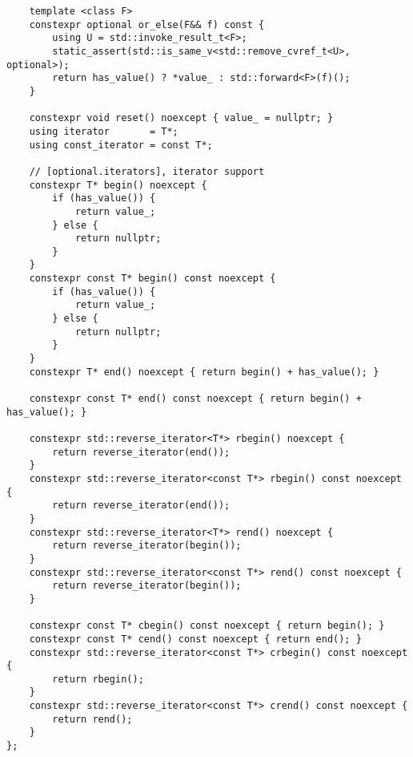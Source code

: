 \documentclass[a4paper,10pt,oneside,openany,final,article]{memoir}
\begin{document}
\begin{verbatim}
    template <class F>
    constexpr optional or_else(F&& f) const {
        using U = std::invoke_result_t<F>;
        static_assert(std::is_same_v<std::remove_cvref_t<U>, optional>);
        return has_value() ? *value_ : std::forward<F>(f)();
    }

    constexpr void reset() noexcept { value_ = nullptr; }
    using iterator       = T*;
    using const_iterator = const T*;

    // [optional.iterators], iterator support
    constexpr T* begin() noexcept {
        if (has_value()) {
            return value_;
        } else {
            return nullptr;
        }
    }
    constexpr const T* begin() const noexcept {
        if (has_value()) {
            return value_;
        } else {
            return nullptr;
        }
    }
    constexpr T* end() noexcept { return begin() + has_value(); }

    constexpr const T* end() const noexcept { return begin() + has_value(); }

    constexpr std::reverse_iterator<T*> rbegin() noexcept {
        return reverse_iterator(end());
    }
    constexpr std::reverse_iterator<const T*> rbegin() const noexcept {
        return reverse_iterator(end());
    }
    constexpr std::reverse_iterator<T*> rend() noexcept {
        return reverse_iterator(begin());
    }
    constexpr std::reverse_iterator<const T*> rend() const noexcept {
        return reverse_iterator(begin());
    }

    constexpr const T* cbegin() const noexcept { return begin(); }
    constexpr const T* cend() const noexcept { return end(); }
    constexpr std::reverse_iterator<const T*> crbegin() const noexcept {
        return rbegin();
    }
    constexpr std::reverse_iterator<const T*> crend() const noexcept {
        return rend();
    }
};
\end{verbatim}
\end{document}
